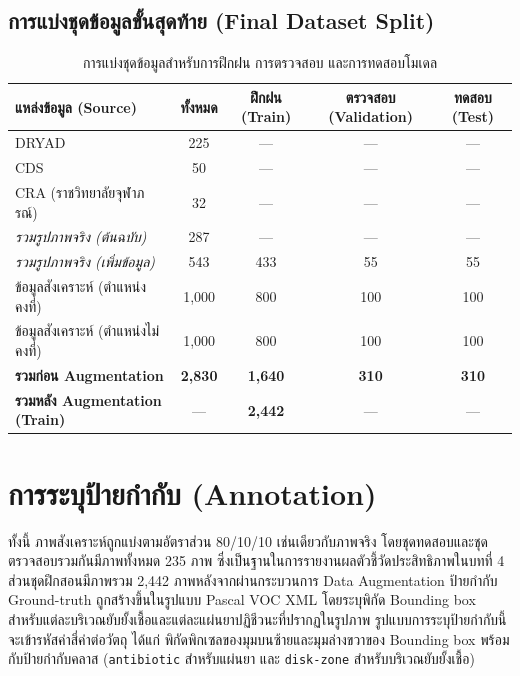 \subsection{การแบ่งชุดข้อมูลขั้นสุดท้าย (Final Dataset Split)}

\begin{table}[H]
  \centering
  \caption{การแบ่งชุดข้อมูลสำหรับการฝึกฝน การตรวจสอบ และการทดสอบโมเดล}
  \label{tab:dataset_split}
  \begin{tabular}{lcccc}
    \toprule
    \textbf{แหล่งข้อมูล (Source)} & \textbf{ทั้งหมด} & \textbf{ฝึกฝน (Train)} & \textbf{ตรวจสอบ (Validation)} & \textbf{ทดสอบ (Test)} \\
    \midrule
    DRYAD                              & 225   & ---   & ---   & ---   \\
    CDS                                & 50    & ---   & ---   & ---   \\
    CRA (ราชวิทยาลัยจุฬาภรณ์)           & 32    & ---   & ---   & ---   \\
    \textit{รวมรูปภาพจริง (ต้นฉบับ)}     & 287   & ---   & ---   & ---   \\
    \textit{รวมรูปภาพจริง (เพิ่มข้อมูล)}  & 543   & 433   & 55    & 55    \\
        ข้อมูลสังเคราะห์ (ตำแหน่งคงที่)       & 1,000 & 800   & 100   & 100   \\
    ข้อมูลสังเคราะห์ (ตำแหน่งไม่คงที่)     & 1,000 & 800   & 100   & 100   \\
    \midrule
    \textbf{รวมก่อน Augmentation}          & \textbf{2,830} & \textbf{1,640} & \textbf{310} & \textbf{310} \\
    \textbf{รวมหลัง Augmentation (Train)}  & ---            & \textbf{2,442} & ---          & ---          \\
    \bottomrule
  \end{tabular}
\end{table}

\section{การระบุป้ายกำกับ (Annotation)}

ทั้งนี้ ภาพสังเคราะห์ถูกแบ่งตามอัตราส่วน 80/10/10 เช่นเดียวกับภาพจริง โดยชุดทดสอบและชุดตรวจสอบรวมกันมีภาพทั้งหมด 235 ภาพ ซึ่งเป็นฐานในการรายงานผลตัวชี้วัดประสิทธิภาพในบทที่ 4 ส่วนชุดฝึกสอนมีภาพรวม 2,442 ภาพหลังจากผ่านกระบวนการ Data Augmentation ป้ายกำกับ Ground-truth ถูกสร้างขึ้นในรูปแบบ Pascal VOC XML โดยระบุพิกัด Bounding box สำหรับแต่ละบริเวณยับยั้งเชื้อและแต่ละแผ่นยาปฏิชีวนะที่ปรากฏในรูปภาพ รูปแบบการระบุป้ายกำกับนี้จะเข้ารหัสค่าสี่ค่าต่อวัตถุ ได้แก่ พิกัดพิกเซลของมุมบนซ้ายและมุมล่างขวาของ Bounding box พร้อมกับป้ายกำกับคลาส (\texttt{antibiotic} สำหรับแผ่นยา และ \texttt{disk-zone} สำหรับบริเวณยับยั้งเชื้อ)

